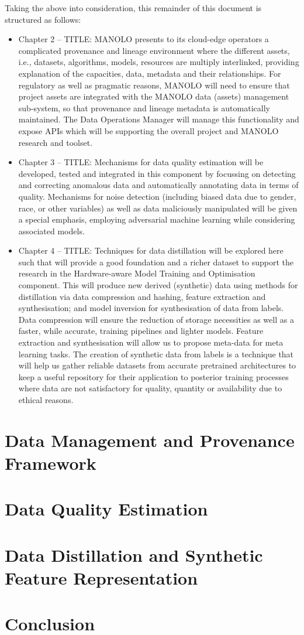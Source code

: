 \documentclass{report}
\begin{document}
Taking the above into consideration, this remainder of this document
is structured as follows:
%
\begin{itemize}
\item Chapter 2 -- TITLE: MANOLO presents to its cloud-edge operators
  a complicated provenance and lineage environment where the different
  assets, i.e., datasets, algorithms, models, resources are multiply
  interlinked, providing explanation of the capacities, data, metadata
  and their relationships. For regulatory as well as pragmatic
  reasons, MANOLO will need to ensure that project assets are
  integrated with the MANOLO data (assets) management sub-system, so
  that provenance and lineage metadata is automatically maintained.
  The Data Operations Manager will manage this functionality and
  expose APIs which will be supporting the overall project and MANOLO
  research and toolset.
\item Chapter 3 -- TITLE: Mechanisms for data quality estimation will
  be developed, tested and integrated in this component by focussing
  on detecting and correcting anomalous data and automatically
  annotating data in terms of quality. Mechanisms for noise detection
  (including biased data due to gender, race, or other variables) as
  well as data maliciously manipulated will be given a special
  emphasis, employing adversarial machine learning while considering
  associated models.
\item Chapter 4 -- TITLE: Techniques for data distillation will be
  explored here such that will provide a good foundation and a richer
  dataset to support the research in the Hardware-aware Model Training
  and Optimisation component. This will produce new derived
  (synthetic) data using methods for distillation via data compression
  and hashing, feature extraction and synthesisation; and model
  inversion for synthesisation of data from labels. Data compression
  will ensure the reduction of storage necessities as well as a
  faster, while accurate, training pipelines and lighter
  models. Feature extraction and synthesisation will allow us to
  propose meta-data for meta learning tasks. The creation of synthetic
  data from labels is a technique that will help us gather reliable
  datasets from accurate pretrained architectures to keep a useful
  repository for their application to posterior training processes
  where data are not satisfactory for quality, quantity or
  availability due to ethical reasons.
\end{itemize}

\chapter{Data Management and Provenance Framework}


\chapter{Data Quality Estimation}


\chapter{Data Distillation and Synthetic Feature Representation}


\chapter{Conclusion}
\end{document}
